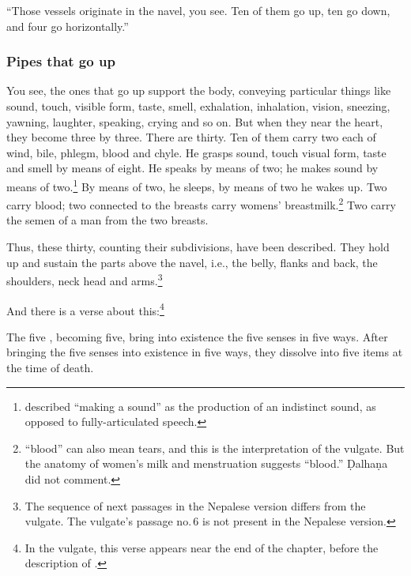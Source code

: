 \begin{refsection}
\begin{translation}
\item[4]

“Those vessels originate in the navel, you see.  Ten of them go up,
ten go down, and four go horizontally.”

\subsubsection{Pipes that go up}

\item[5]

You see, the ones that go up support the body, conveying particular
things like sound, touch, visible form, taste, smell, exhalation,
inhalation, vision, sneezing, yawning, laughter, speaking, crying and
so on.  But when they near the heart, they become three by three.
There are thirty.  Ten of them carry two each of wind, bile, phlegm,
blood and chyle. He grasps sound, touch visual form, taste and smell
by means of eight. He speaks by means of two; he makes sound by means
of two.\footnote{ described “making a sound” as
    the production of an indistinct sound, as opposed to fully-articulated
    speech.}  By means of two, he sleeps, by means of two he wakes up. Two
    carry blood;  two connected to the breasts carry womens'
    breastmilk.\footnote{ “blood” can also mean tears, and this
        is the interpretation of the vulgate.  But the anatomy of women's milk
        and menstruation suggests “blood.” Ḍalhaṇa did not comment.} Two carry
        the semen of a man from the two breasts.

    Thus, these thirty, counting their subdivisions, have been described.
    They hold up and sustain the parts above the navel, i.e., the belly,
    flanks and back, the shoulders, neck head and arms.\footnote{The sequence
        of next passages in the Nepalese version differs from the vulgate. The vulgate's
        passage no.\,6 is not present in the Nepalese version.}

    \item[11] 
    
    And there is a verse about this:\footnote{In the
    vulgate, this verse appears near the end of the chapter, before
    the description of .}
    \begin{sloka}
        The five , becoming five, bring
        into existence the five senses in five ways. After bringing the
        five senses into existence in five ways,  they dissolve into five
        items at the time of death.
    \end{sloka}



\end{translation}
\end{refsection}
